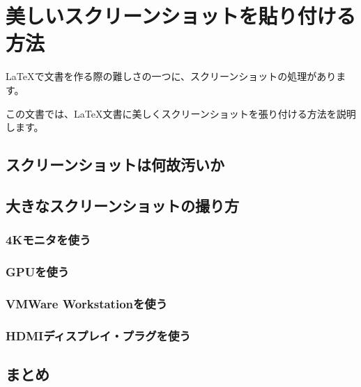 \chapter{美しいスクリーンショットを貼り付ける方法}
\label{chap:screenshot}

\LaTeX で文書を作る際の難しさの一つに、スクリーンショットの処理があります。

この文書では、\LaTeX 文書に美しくスクリーンショットを張り付ける方法を説明します。

\section{スクリーンショットは何故汚いか}


\section{大きなスクリーンショットの撮り方}
\subsection{4Kモニタを使う}
\subsection{GPUを使う}
\subsection{VMWare Workstationを使う}
\subsection{HDMIディスプレイ・プラグを使う}
\section{まとめ}